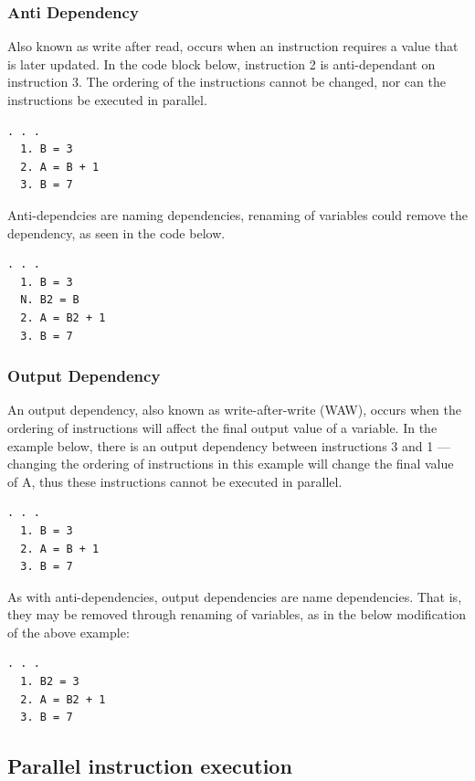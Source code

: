 \subsubsection{Anti Dependency}
Also known as write after read, occurs when an instruction requires a value that is later updated. In the code block below, instruction 2 is anti-dependant on instruction 3. The ordering of the instructions cannot be changed, nor can the instructions be executed in parallel. 
\begin{lstlisting}[frame=single]  % Start your code-block
  . . .
  1. B = 3
  2. A = B + 1
  3. B = 7
\end{lstlisting}

Anti-dependcies are naming dependencies, renaming of variables could remove the dependency, as seen in the code below. \\

\begin{lstlisting}[frame=single]  % Start your code-block
  . . .
  1. B = 3
  N. B2 = B
  2. A = B2 + 1
  3. B = 7
\end{lstlisting}

\subsubsection{Output Dependency}
An output dependency, also known as write-after-write (WAW), occurs when the ordering of instructions will affect the final output value of a variable. In the example below, there is an output dependency between instructions 3 and 1 — changing the ordering of instructions in this example will change the final value of A, thus these instructions cannot be executed in parallel.

\begin{lstlisting}[frame=single]  % Start your code-block
  . . .
  1. B = 3
  2. A = B + 1
  3. B = 7
\end{lstlisting}

As with anti-dependencies, output dependencies are name dependencies. That is, they may be removed through renaming of variables, as in the below modification of the above example:

\begin{lstlisting}[frame=single]  % Start your code-block
  . . .
  1. B2 = 3
  2. A = B2 + 1
  3. B = 7
\end{lstlisting}

\subsection{Parallel instruction execution}
